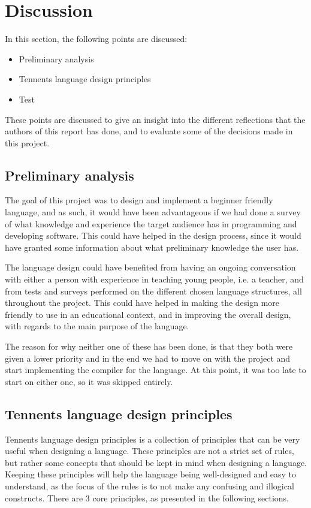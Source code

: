 \section{Discussion}
In this section, the following points are discussed:

\begin{itemize}
    \item Preliminary analysis
    \item Tennents language design principles
    \item Test
\end{itemize}

These points are discussed to give an insight into the different reflections that the authors of this report has done, and to evaluate some of the decisions made in this project.


\subsection{Preliminary analysis}
The goal of this project was to design and implement a beginner friendly language, and as such, it would have been advantageous if we had done a survey of what knowledge and experience the target audience has in programming and developing software. This could have helped in the design process, since it would have granted some information about what preliminary knowledge the user has.

The language design could have benefited from having an ongoing conversation with either a person with experience in teaching young people, i.e. a teacher, and from tests and surveys performed on the different chosen language structures, all throughout the project. This could have helped in making the design more friendly to use in an educational context, and in improving the overall design, with regards to the main purpose of the language.

The reason for why neither one of these has been done, is that they both were given a lower priority and in the end we had to move on with the project and start implementing the compiler for the language. At this point, it was too late to start on either one, so it was skipped entirely.

\subsection{Tennents language design principles}
Tennents language design principles is a collection of principles that can be very useful when designing a language. These principles are not a strict set of rules, but rather some concepts that should be kept in mind when designing a language. Keeping these principles will help the language being well-designed and easy to understand, as the focus of the rules is to not make any confusing and illogical constructs. There are 3 core principles, as presented in the following sections. 


